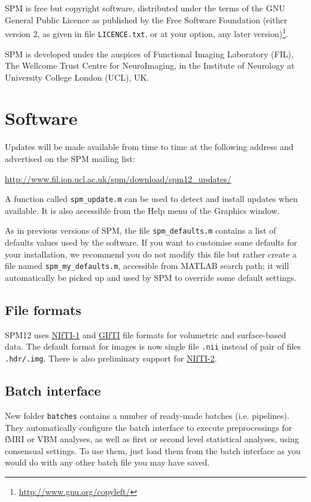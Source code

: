 \documentclass[a4paper,titlepage,openany]{article}
\begin{document}
SPM is free but copyright software, distributed under the terms of the GNU General Public Licence as published by the Free Software Foundation (either version 2, as given in file \texttt{LICENCE.txt}, or at your option, any later version)\footnote{\url{http://www.gnu.org/copyleft/}}.

SPM is developed under the auspices of Functional Imaging Laboratory (FIL), The Wellcome Trust Centre for NeuroImaging, in the Institute of Neurology at University College London (UCL), UK.

\vspace{10mm}

\section{Software}
Updates will be made available from time to time at the following address and advertised on the SPM mailing list:

\qquad \url{http://www.fil.ion.ucl.ac.uk/spm/download/spm12_updates/}

A function called \texttt{spm\_update.m} can be used to detect and install updates when available. It is also accessible from the Help menu of the Graphics window.

As in previous versions of SPM, the file \texttt{spm\_defaults.m} contains a list of defaults values used by the software. If you want to customise some defaults for your installation, we recommend you do not modify this file but rather create a file named \texttt{spm\_my\_defaults.m}, accessible from MATLAB search path; it will automatically be picked up and used by SPM to override some default settings.

\subsection{File formats}
SPM12 uses \href{http://nifti.nimh.nih.gov/nifti-1}{NIfTI-1} and \href{http://www.nitrc.org/projects/gifti/}{GIfTI} file formats for volumetric and surface-based data. The default format for images is now single file \texttt{.nii} instead of pair of files \texttt{.hdr/.img}. There is also preliminary support for \href{http://nifti.nimh.nih.gov/nifti-2}{NIfTI-2}.

\subsection{Batch interface}
New folder \texttt{batches} contains a number of ready-made batches (i.e. pipelines). They automatically configure the batch interface to execute preprocessings for fMRI or VBM analyses, as well as first or second level statistical analyses, using consensual settings. To use them, just load them from the batch interface as you would do with any other batch file you may have saved.
\end{document}
